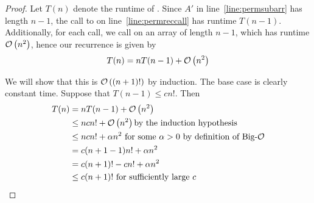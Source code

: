 \documentclass[final]{article}
\begin{document}
\begin{proof}
    Let $T(n)$ denote the runtime of . Since $A'$ in line~\ref{line:permsubarr} has length $n - 1$, the call to  on line~\ref{line:permreccall} has runtime $T(n - 1)$. Additionally, for each call, we call  on an array of length $n - 1$, which has runtime $\mathcal{O}\left(n^2\right)$, hence our recurrence is given by
    \[T(n) = nT(n - 1) + \mathcal{O}\left(n^2\right)\]

    We will show that this is $\mathcal{O}\left((n + 1)!\right)$ by induction. The base case is clearly constant time. Suppose that $T(n - 1) \leq cn!$. Then
    \begin{align*}T(n)
         & = nT(n - 1) + \mathcal{O}\left(n^2\right)                                                       \\
         & \leq ncn! + \mathcal{O}\left(n^2\right)\hbox{by the induction hypothesis}                       \\
         & \leq ncn! + \alpha n^2\hbox{ for some $\alpha > 0$ by definition of \text{Big-}$\mathcal{O}$} \\
         & = c(n + 1 - 1)n! + \alpha n^2                                                  \\
         & = c(n + 1)! - cn! + \alpha n^2                                                 \\
         & \leq c(n + 1)!\hbox{ for sufficiently large $c$}\qedhere
    \end{align*}
\end{proof}
\end{document}
